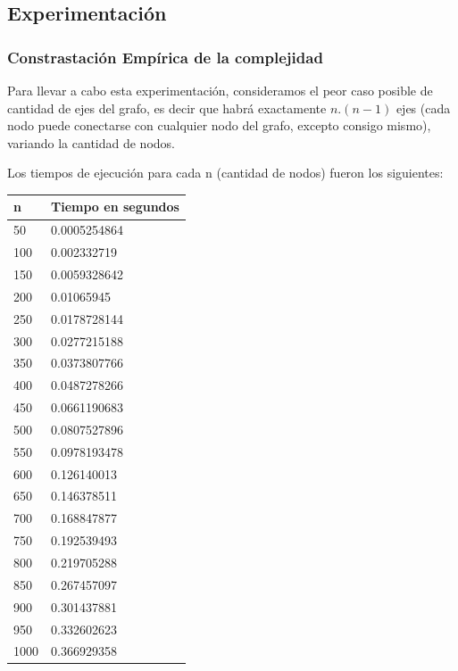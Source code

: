\subsection{Experimentaci\'on}
\subsubsection{Constrastaci\'on Emp\'irica de la complejidad}
	Para llevar a cabo esta experimentaci\'on, consideramos el peor caso posible de cantidad de ejes del grafo, es decir que habr\'a exactamente $n.(n-1)$ ejes (cada nodo puede conectarse con cualquier nodo del grafo, excepto consigo mismo), variando la cantidad de nodos.
	
	Los tiempos de ejecuci\'on para cada n (cantidad de nodos) fueron los siguientes:
	
	\begin{table}[htb]
	\centering
	\begin{tabular}[c]{|l|l|}

		\hline
n & Tiempo en segundos\\
		\hline
50	&	0.0005254864\\
		\hline
100	&	0.002332719\\
		\hline
150	&	0.0059328642\\
		\hline
200	&	0.01065945\\
		\hline
250	&	0.0178728144\\
		\hline
300	&	0.0277215188\\
		\hline
350	&	0.0373807766\\
		\hline
400	&	0.0487278266\\
		\hline
450	&	0.0661190683\\
		\hline
500	&	0.0807527896\\
		\hline
550	&	0.0978193478\\
		\hline
600	&	0.126140013\\
		\hline
650	&	0.146378511\\
		\hline
700	&	0.168847877\\
		\hline
750	&	0.192539493\\
		\hline
800	&	0.219705288\\
		\hline
850	&	0.267457097\\
		\hline
900	&	0.301437881\\
		\hline
950	&	0.332602623\\
		\hline
1000	&	0.366929358\\
		\hline
		
	\end{tabular}
	\end{table}

